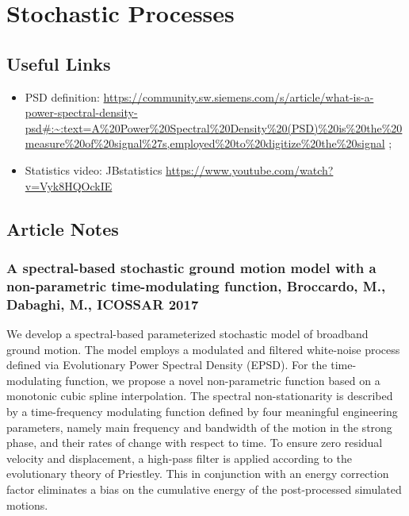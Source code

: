 \newpage
\chapter{Stochastic Processes}

\section{Useful Links}
\begin{itemize}
    \item PSD definition: \url{https://community.sw.siemens.com/s/article/what-is-a-power-spectral-density-psd#:~:text=A\%20Power\%20Spectral\%20Density\%20(PSD)\%20is\%20the\%20measure\%20of\%20signal\%27s,employed\%20to\%20digitize\%20the\%20signal} ;\\
    \item Statistics video: JBstatistics \url{https://www.youtube.com/watch?v=Vyk8HQOckIE}
\end{itemize}


\section{Article Notes}
\subsection{A spectral-based stochastic ground motion model with a non-parametric time-modulating function, Broccardo, M., Dabaghi, M., ICOSSAR 2017}
We develop a spectral-based parameterized stochastic model of broadband ground motion.
The model employs a modulated and filtered white-noise process defined via Evolutionary
Power Spectral Density (EPSD). For the time-modulating function, we propose a novel non-parametric function based on a monotonic cubic spline interpolation. The spectral non-stationarity is described by a time-frequency modulating function defined by four
meaningful engineering parameters, namely main frequency and bandwidth of the motion in the strong phase, and their rates of change with respect to time.
To ensure zero residual velocity and displacement, a
high-pass filter is applied according to the evolutionary theory of Priestley. This in
conjunction with an energy correction factor eliminates a bias on the cumulative energy of the post-processed simulated motions.


